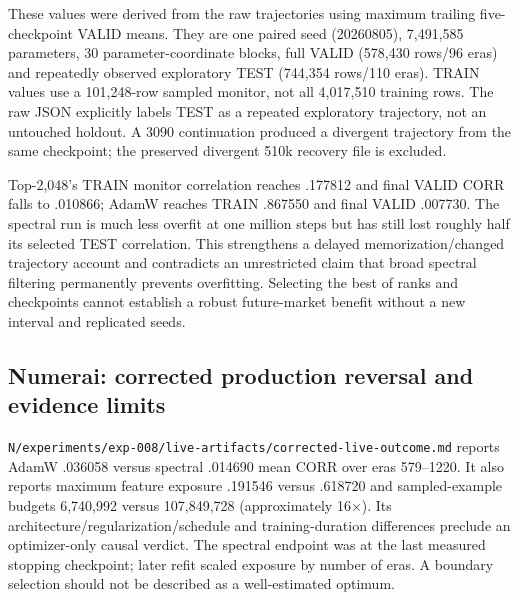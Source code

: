 \documentclass[
  british,
  10pt,
  a4paper,
]{article}
\begin{document}
These values were derived from the raw trajectories using maximum
trailing five-\allowbreak{}checkpoint VALID means. They are one paired
seed (20260805),\allowbreak{} 7,491,585 parameters,\allowbreak{} 30
parameter-\allowbreak{}coordinate blocks, full VALID (578,430 rows/96
eras) and repeatedly observed exploratory TEST (744,354 rows/110 eras).
TRAIN values use a 101,\allowbreak{}248-\allowbreak{}row sampled
monitor, not all 4,017,510 training rows. The raw JSON explicitly labels
TEST as a repeated exploratory trajectory,\allowbreak{} not an untouched
holdout. A 3090 continuation produced a divergent trajectory from the
same checkpoint; the preserved divergent 510k recovery file is excluded.

Top-\allowbreak{}2,\allowbreak{}048’s TRAIN monitor correlation reaches
.177812 and final VALID CORR falls to .010866; AdamW reaches TRAIN
.867550 and final VALID .007730. The spectral run is much less overfit
at one million steps but has still lost roughly half its selected TEST
correlation.\allowbreak{} This strengthens a delayed
memorization\allowbreak{}/\allowbreak{}changed trajectory account and
contradicts an unrestricted claim that broad spectral filtering
permanently prevents overfitting.\allowbreak{} Selecting the best of
ranks and checkpoints cannot establish a robust
future-\allowbreak{}market benefit without a new interval and replicated
seeds.

\subsection{Numerai: corrected production reversal and evidence
limits}\label{external-results-audit--numerai-corrected-production-reversal-and-evidence-limits}

\texttt{N/\allowbreak{}experiments/\allowbreak{}exp-\allowbreak{}008/\allowbreak{}live-\allowbreak{}artifacts/\allowbreak{}corrected-\allowbreak{}live-\allowbreak{}outcome.\allowbreak{}md}
reports AdamW .036058 versus spectral .014690 mean CORR over eras
579--1220. It also reports maximum feature exposure .191546 versus
.618720 and sampled-\allowbreak{}example budgets 6,740,992 versus
107,\allowbreak{}849,\allowbreak{}728 (approximately 16×). Its
architecture\allowbreak{}/\allowbreak{}regularizati\allowbreak{}on/\allowbreak{}schedule
and training-\allowbreak{}duration differences preclude an
optimizer-\allowbreak{}only causal verdict. The spectral endpoint was at
the last measured stopping checkpoint; later refit scaled exposure by
number of eras. A boundary selection should not be described as a
well-\allowbreak{}estimated optimum.
\end{document}

